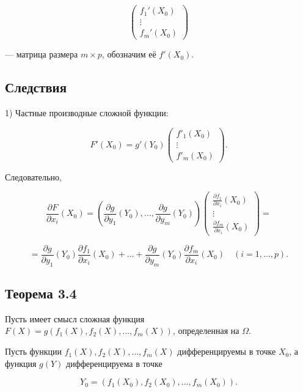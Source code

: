 {\[
\begin{pmatrix} f_1'(X_0) \\ \vdots \\ f_m'(X_0) \end{pmatrix}
\]


— матрица размера \( m \times p \), обозначим её \( f'(X_0) \).

\subsection*{Следствия}

1) Частные производные сложной функции:



\[
F'(X_0) = g'(Y_0) \begin{pmatrix} f'_1(X_0) \\ \vdots \\ f'_m(X_0) \end{pmatrix}.
\]



Следовательно,



\[
\frac{\partial F}{\partial x_i}(X_0) = \left( \frac{\partial g}{\partial y_1}(Y_0), \ldots, \frac{\partial g}{\partial y_m}(Y_0) \right) \begin{pmatrix} \frac{\partial f_1}{\partial x_i}(X_0) \\ \vdots \\ \frac{\partial f_m}{\partial x_i}(X_0) \end{pmatrix} =
\]





\[
= \frac{\partial g}{\partial y_1}(Y_0) \frac{\partial f_1}{\partial x_i}(X_0) + \ldots + \frac{\partial g}{\partial y_m}(Y_0) \frac{\partial f_m}{\partial x_i}(X_0) \quad (i = 1, \ldots, p).
\]

\subsection*{Теорема 3.4}

Пусть имеет смысл сложная функция \( F(X) = g(f_1(X), f_2(X), \dots, f_m(X)) \), определенная на \( \Omega \).

Пусть функции \( f_1(X), f_2(X), \dots, f_m(X) \) дифференцируемы в точке \( X_0 \), а функция \( g(Y) \) дифференцируема в точке



\[
Y_0 = (f_1(X_0), f_2(X_0), \dots, f_m(X_0)).
\]



}
